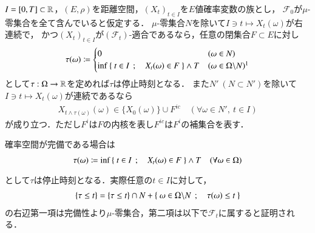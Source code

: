 	\begin{itembox}[l]{}
		\begin{thm}[閉集合と停止時刻]
			$I = [0,T] \subset \mathbb{R}$，$(E,\rho)$を距離空間，$(X_t)_{t \in I}$を$E$値確率変数の族とし，
			$\mathcal{F}_0$が$\mu$-零集合を全て含んでいると仮定する．
			$\mu$-零集合$N$を除いて$I \ni t \longmapsto X_t(\omega)$が右連続で，
			かつ$(X_t)_{t \in I}$が$(\mathcal{F}_t)$-適合であるなら，任意の閉集合$F \subset E$に対し
			\begin{align}
				\tau(\omega) \coloneqq
				\begin{cases}
					0 & (\omega \in N) \\
					\inf{}{\Set{t \in I}{X_t(\omega) \in F}} \wedge T & (\omega \in \Omega \backslash N) \footnotemark
				\end{cases}
			\end{align}
			として$\tau:\Omega \rightarrow \mathbb{R}$を定めれば$\tau$は停止時刻となる．
			また$N'\ (N \subset N')$を除いて$I \ni t \longmapsto X_t(\omega)$が連続であるなら
			\begin{align}
				X_{t \wedge \tau(\omega)}(\omega) \in \{ X_0(\omega) \} \cup F^{ic} \quad (\forall \omega \in N',\ t \in I)
			\end{align}
			が成り立つ．ただし$F^i$は$F$の内核を表し$F^{ic}$は$F^i$の補集合を表す．
			\label{thm:closed_set_stopping_time}
		\end{thm}
	\end{itembox}
	確率空間が完備である場合は
	\begin{align}
		\tau(\omega) \coloneqq \operatorname*{inf}_{} \left\{\ t \in I\ \, ; \quad X_t(\omega) \in F\ \right\} \wedge T
		\quad (\forall \omega \in \Omega)
	\end{align}
	として$\tau$は停止時刻となる．実際任意の$t \in I$に対して，
	\begin{align}
		\{\tau \leq t\} = \{\tau \leq t\} \cap N + \left\{\ \omega \in \Omega \backslash N\ \, ; \quad \tau(\omega) \leq t\ \right\}
	\end{align}
	の右辺第一項は完備性より$\mu$-零集合，第二項は以下で$\mathcal{F}_t$に属すると証明される．

